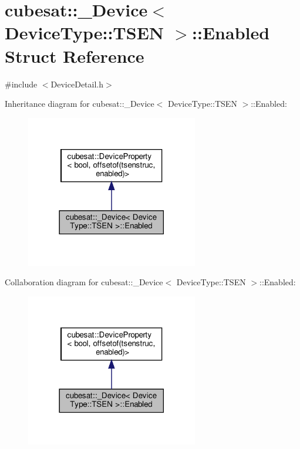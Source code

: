 \hypertarget{structcubesat_1_1__Device_3_01DeviceType_1_1TSEN_01_4_1_1Enabled}{}\section{cubesat\+:\+:\+\_\+\+Device$<$ Device\+Type\+:\+:T\+S\+EN $>$\+:\+:Enabled Struct Reference}
\label{structcubesat_1_1__Device_3_01DeviceType_1_1TSEN_01_4_1_1Enabled}


{\ttfamily \#include $<$Device\+Detail.\+h$>$}



Inheritance diagram for cubesat\+:\+:\+\_\+\+Device$<$ Device\+Type\+:\+:T\+S\+EN $>$\+:\+:Enabled\+:\nopagebreak
\begin{figure}[H]
\begin{center}
\leavevmode
\includegraphics[width=213pt]{structcubesat_1_1__Device_3_01DeviceType_1_1TSEN_01_4_1_1Enabled__inherit__graph}
\end{center}
\end{figure}


Collaboration diagram for cubesat\+:\+:\+\_\+\+Device$<$ Device\+Type\+:\+:T\+S\+EN $>$\+:\+:Enabled\+:\nopagebreak
\begin{figure}[H]
\begin{center}
\leavevmode
\includegraphics[width=213pt]{structcubesat_1_1__Device_3_01DeviceType_1_1TSEN_01_4_1_1Enabled__coll__graph}
\end{center}
\end{figure}
